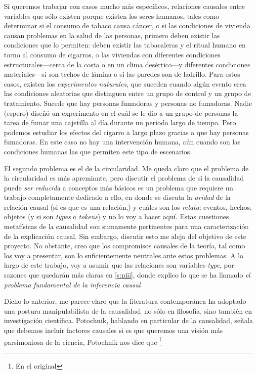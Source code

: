 {{Si queremos trabajar con casos mucho más específicos,
relaciones causales entre variables que sólo existen porque
existen los seres humanos, tales como determinar si el
consumo de tabaco causa cáncer, o si las condiciones de
vivienda causan problemas en la salud de las personas,
primero deben existir las condiciones que lo permiten: deben
existir las tabacaleras y el ritual humano en torno al
consumo de cigarros, o las viviendas con diferentes
condiciones estructurales---cerca de la costa o en un clima
desértico---y diferentes condiciones materiales---si son
techos de lámina o si las paredes son de ladrillo. Para
estos casos, existen los \emph{experimentos naturales,} que
suceden cuando algún evento crea las condiciones aleatorias
que distinguen entre un grupo de control y un grupo de
tratamiento. Sucede que hay personas fumadoras y personas no
fumadoras. Nadie (espero) diseñó un experimento en el cuál
se le dio a un grupo de personas la tarea de fumar una
cajetilla al día durante un periodo largo de tiempo. Pero
podemos estudiar los efectos del cigarro a largo plazo
gracias a que hay personas fumadoras. En este caso no hay
una intervención humana, aún cuando son las condiciones
humanas las que permiten este tipo de escenarios.

El segundo problema es el de la circularidad. Me queda claro
que el problema de la circularidad es más apremiante, pero
discutir el problema de si la causalidad puede \emph{ser
reducida} a conceptos más básicos es un problema que
requiere un trabajo completamente dedicado a ello, en donde
se discuta la \emph{aridad} de la relación causal (si es que
es una relación,) y cuáles son los \emph{relata:} eventos,
hechos, objetos (y si son \emph{types} o \emph{tokens}) y no
lo voy a hacer aquí. Estas cuestiones metafísicas de la
causalidad son sumamente pertinentes para una
caracterización de la explicación causal. Sin embargo, discutir
esto me aleja del objetivo de este proyecto. No obstante,
creo que los compromisos causales de la teoría, tal como los voy a
presentar, son lo suficientemente neutrales ante estos
problemas. A lo largo de este trabajo, voy a asumir que las relaciones son
variables-\emph{type}, por razones que quedarán más claras
en \ref{s:piii}, donde explico lo que
se ha llamado \emph{el problema fundamental de la inferencia
causal}

Dicho lo anterior, me parece claro que la literatura
contemporánea ha adoptado una postura manipulabilista de la
causalidad, no sólo en filosofía, sino también en
investigación científica. Potochnik, hablando en particular
de la causalidad, señala que debemos incluir factores
causales si es que queremos una visión más parsimoniosa de
la ciencia, Potochnik nos dice que \footnote{
  En el original 
}

}}
